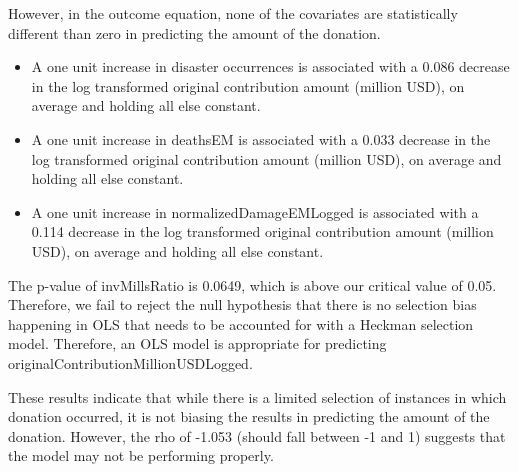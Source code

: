 \documentclass[12pt,letterpaper]{article}
\begin{document}
\newpage

\noindent However, in the outcome equation, none of the covariates are statistically different than zero in predicting the amount of the donation.

\begin{itemize}
\item A one unit increase in disaster occurrences is associated with a 0.086 decrease in the log transformed original contribution amount (million USD), on average and holding all else constant.

\item A one unit increase in deathsEM is associated with a 0.033 decrease in the log transformed original contribution amount (million USD), on average and holding all else constant.

\item A one unit increase in normalizedDamageEMLogged is associated with a 0.114 decrease in the log transformed original contribution amount (million USD), on average and holding all else constant.

\end{itemize}

\vspace{.5cm}

\noindent The p-value of invMillsRatio is 0.0649, which is above our critical value of 0.05. Therefore, we fail to reject the null hypothesis that there is no selection bias happening in OLS that needs to be accounted for with a Heckman selection model. Therefore, an OLS model is appropriate for predicting originalContributionMillionUSDLogged.

\vspace{.5cm}

\noindent These results indicate that while there is a limited selection of instances in which donation occurred, it is not biasing the results in predicting the amount of the donation. However, the rho of -1.053 (should fall between -1 and 1) suggests that the model may not be performing properly.
\end{document}
